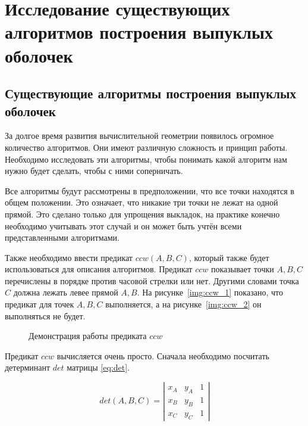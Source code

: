 \chapter{Исследование существующих алгоритмов построения выпуклых оболочек} \label{chapt1}

\section{Существующие алгоритмы построения выпуклых оболочек} \label{sect1_1}


За долгое время развития вычислительной геометрии появилось огромное количество алгоритмов. Они имеют различную сложность и принцип работы. Необходимо исследовать эти алгоритмы, чтобы понимать какой алгоритм нам нужно будет сделать, чтобы с ними соперничать.

Все алгоритмы будут рассмотрены в предположении, что все точки находятся в общем положении. Это означает, что никакие три точки не лежат на одной прямой. Это сделано только для упрощения выкладок, на практике конечно необходимо учитывать этот случай и он может быть учтён всеми представленными алгоритмами.

Также необходимо ввести предикат $ccw(A, B, C)$, который также будет использоваться для описания алгоритмов. Предикат $ccw$ показывает точки $A, B, C$ перечислены в порядке против часовой стрелки или нет. Другими словами точка $C$ должна лежать левее прямой $A, B$. На рисунке~\ref{img:ccw_1} показано, что предикат для точек $A, B, C$ выполняется, а на рисунке~\ref{img:ccw_2} он выполняться не будет.

\begin{figure}[H]
	{\centering
		\hfill
		\subbottom[\label{img:ccw_1}]{%
			}
		\hfill
		\subbottom[\label{img:ccw_2}]{%
			}
		\hfill
	}
	\caption{Демонстрация работы предиката $ccw$}
	\label{img:ccw}
\end{figure}

Предикат $ccw$ вычисляется очень просто. Сначала необходимо посчитать детерминант $det$ матрицы \eqref{eq:det}.

\begin{equation}\label{eq:det}
det(A, B, C)= \left| \begin{array}{ccc} x_A & y_A & 1 \\ x_B & y_B & 1 \\ x_C & y_C & 1  \end{array}\right|
\end{equation}

